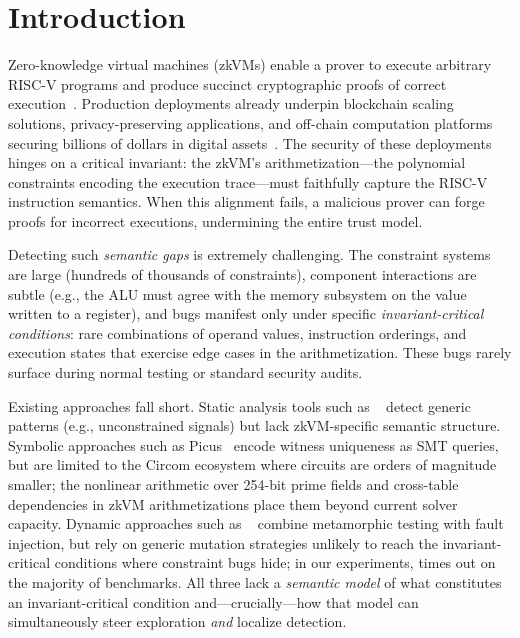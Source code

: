 \section{Introduction}\label{sec:intro}

Zero-knowledge virtual machines (zkVMs) enable a prover to execute arbitrary RISC-V programs and produce succinct cryptographic proofs of correct execution~\cite{risc0, sp1, jolt}. Production deployments already underpin blockchain scaling solutions, privacy-preserving applications, and off-chain computation platforms securing billions of dollars in digital assets~\cite{openvm, nexus, pico}. The security of these deployments hinges on a critical invariant: the zkVM's arithmetization---the polynomial constraints encoding the execution trace---must faithfully capture the RISC-V instruction semantics. When this alignment fails, a malicious prover can forge proofs for incorrect executions, undermining the entire trust model.

Detecting such \emph{semantic gaps} is extremely challenging. The constraint systems are large (hundreds of thousands of constraints), component interactions are subtle (e.g., the ALU must agree with the memory subsystem on the value written to a register), and bugs manifest only under specific \emph{invariant-critical conditions}: rare combinations of operand values, instruction orderings, and execution states that exercise edge cases in the arithmetization. These bugs rarely surface during normal testing or standard security audits.

Existing approaches fall short. Static analysis tools such as \zkap~\cite{zkap} detect generic patterns (e.g., unconstrained signals) but lack zkVM-specific semantic structure. Symbolic approaches such as Picus~\cite{picus} encode witness uniqueness as SMT queries, but are limited to the Circom ecosystem where circuits are orders of magnitude smaller; the nonlinear arithmetic over 254-bit prime fields and cross-table dependencies in zkVM arithmetizations place them beyond current solver capacity. Dynamic approaches such as \arguzz~\cite{arguzz} combine metamorphic testing with fault injection, but rely on generic mutation strategies unlikely to reach the invariant-critical conditions where constraint bugs hide; in our experiments, \arguzz times out on the majority of benchmarks. All three lack a \emph{semantic model} of what constitutes an invariant-critical condition and---crucially---how that model can simultaneously steer exploration \emph{and} localize detection.

